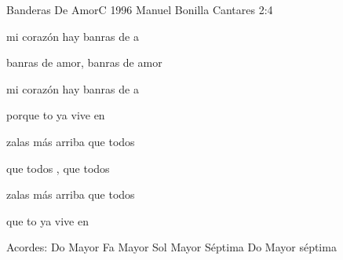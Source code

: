 \documentclass[12pt, spanish]{book}
\newcommand{\NotCCLIed}{\relax}
\begin{document}
    \begin{song}{Banderas De Amor}{C}
        {1996} %
        {Manuel Bonilla}
        {Cantares 2:4} %
        {} %

        \begin{SBOpGroup}
             mi corazón hay banras de a

            banras de amor, banras de amor

             mi corazón hay banras de a

            porque to ya vive en 
        \end{SBOpGroup}

        \begin{SBOpGroup}
            zalas más arriba que todos 

            que todos , que todos 

            zalas más arriba que todos 

            que to ya vive en 
        \end{SBOpGroup}

        \ifChordBk
        \begin{SBOpGroup}
            Acordes:
            \upchord{\C}\qquad Do Mayor \hfill
            \upchord{\F}\qquad Fa Mayor \hfill\null\break
            \upchord{\Gseven}Sol Mayor S\'eptima \hfill
            \upchord{\Cseven}\qquad Do Mayor s\'eptima \hfill\null\break
        \end{SBOpGroup}
        \fi
    \end{song}
\end{document}
